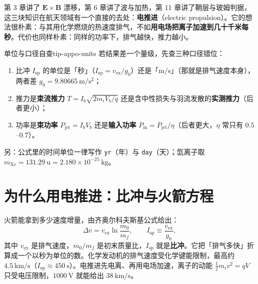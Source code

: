 
第 3 章讲了 $\mathbf{E}\times\mathbf{B}$ 漂移，第 6 章讲了波与加热，第 11 章讲了鞘层与玻姆判据，这三块知识在航天领域有一个直接的去处：\textbf{电推进}（electric propulsion）。它的想法很朴素：与其用化学燃烧的热速度排气，不如\textbf{用电场把离子加速到几十千米每秒}。代价也同样朴素：同样的功率下，排气越快，推力越小。

\begin{tip}{单位与口径自查}{tip-appo-units}
若结果差一个量级，先查三种口径错位：
\begin{enumerate}[nosep,leftmargin=1.6em]
  \item 比冲 $I_{\mathrm{sp}}$ 的单位是「秒」（$I_{\mathrm{sp}}=v_{\mathrm{ex}}/g_0$）还是「$\mathrm{m/s}$」（那就是排气速度本身），两者差 $g_0=9.80665\ \mathrm{m/s^2}$；
  \item 推力是\textbf{束流推力} $T=I_b\sqrt{2m_iV_b/q}$ 还是含中性损失与羽流发散的\textbf{实测推力}（后者更小）；
  \item 功率是\textbf{束功率} $P_{\mathrm{jet}}=I_bV_b$ 还是\textbf{输入功率} $P_{\mathrm{in}}=P_{\mathrm{jet}}/\eta$（后者更大，$\eta$ 常只有 $0.5$--$0.7$）。
\end{enumerate}
另：公式里的时间单位一律写作 \texttt{yr}（年）与 \texttt{day}（天）；氙离子取 $m_{\mathrm{Xe}}=131.29\ \mathrm{u}=2.180\times10^{-25}\ \mathrm{kg}$。
\end{tip}


\section{为什么用电推进：比冲与火箭方程}

火箭能拿到多少速度增量，由齐奥尔科夫斯基公式给出：
\begin{equation}
\Delta v=v_{\mathrm{ex}}\ln\frac{m_0}{m_f},
\qquad
I_{\mathrm{sp}}\equiv\frac{v_{\mathrm{ex}}}{g_0},
\label{eq:app-o-rocket}
\end{equation}
其中 $v_{\mathrm{ex}}$ 是排气速度，$m_0/m_f$ 是初末质量比，$I_{\mathrm{sp}}$ 就是\textbf{比冲}。它把「排气多快」折算成一个以秒为单位的数。化学发动机的排气速度受化学键能限制，最高约 $4.5\ \mathrm{km/s}$（$I_{\mathrm{sp}}\approx450\ \mathrm{s}$）。电推进先电离、再用电场加速，离子的动能 $\frac12m_iv^2=qV$ 只受电压限制，$1000\ \mathrm{V}$ 就能给出 $38\ \mathrm{km/s}$。

